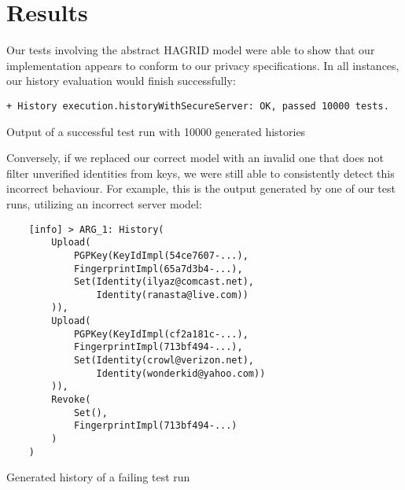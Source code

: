 \section{Results}

Our tests involving the abstract HAGRID model were able to show that our implementation appears to conform to our privacy specifications.
In all instances, our history evaluation would finish successfully: 
\begin{code}
    \begin{verbatim}
+ History execution.historyWithSecureServer: OK, passed 10000 tests.
    \end{verbatim}
    \caption{Output of a successful test run with 10000 generated histories}
\end{code} 
\bigskip 
Conversely, if we replaced our correct model with an invalid one that does not filter unverified identities from keys, we were still able to consistently detect this incorrect behaviour. For example, this is the output generated by one of our test runs, utilizing an incorrect server model: 
\begin{code}
    \begin{verbatim}
    [info] > ARG_1: History(
        Upload(
            PGPKey(KeyIdImpl(54ce7607-...),
            FingerprintImpl(65a7d3b4-...),
            Set(Identity(ilyaz@comcast.net), 
                Identity(ranasta@live.com))
        )), 
        Upload(
            PGPKey(KeyIdImpl(cf2a181c-...),
            FingerprintImpl(713bf494-...),
            Set(Identity(crowl@verizon.net), 
                Identity(wonderkid@yahoo.com))
        )), 
        Revoke(
            Set(),
            FingerprintImpl(713bf494-...)
        )
    )
    \end{verbatim}
    \caption{Generated history of a failing test run}
\end{code}


